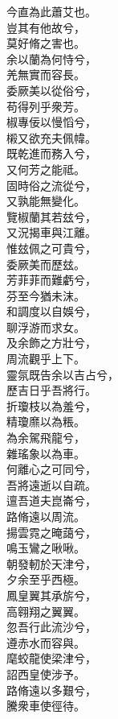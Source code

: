 \begin{pinyinscope}
\begin{shici}
今直為此蕭艾也。\\
豈其有他故兮，\\
莫好脩之害也。\\
余以蘭為何恃兮，\\
羌無實而容長。\\
委厥美以從俗兮，\\
苟得列乎衆芳。\\
椒專佞以慢慆兮，\\
樧又欲充夫佩幃。\\
既乾進而務入兮，\\
又何芳之能祗。\\
固時俗之流從兮，\\
又孰能無變化。\\
覽椒蘭其若玆兮，\\
又況揭車與江離。\\
惟玆佩之可貴兮，\\
委厥美而歷玆。\\
芳菲菲而難虧兮，\\
芬至今猶未沫。\\
和調度以自娛兮，\\
聊浮游而求女。\\
及余飾之方壯兮，\\
周流觀乎上下。\\
靈氛既告余以吉占兮，\\
歷吉日乎吾將行。\\
折瓊枝以為羞兮，\\
精瓊爢以為粻。\\
為余駕飛龍兮，\\
雜瑤象以為車。\\
何離心之可同兮，\\
吾將遠逝以自疏。\\
邅吾道夫崑崙兮，\\
路脩遠以周流。\\
揚雲霓之晻藹兮，\\
鳴玉鸞之啾啾。\\
朝發軔於天津兮，\\
夕余至乎西極。\\
鳳皇翼其承旂兮，\\
高翱翔之翼翼。\\
忽吾行此流沙兮，\\
遵赤水而容與。\\
麾蛟龍使梁津兮，\\
詔西皇使涉予。\\
路脩遠以多艱兮，\\
騰衆車使徑待。\\

\end{shici}
\end{pinyinscope}

